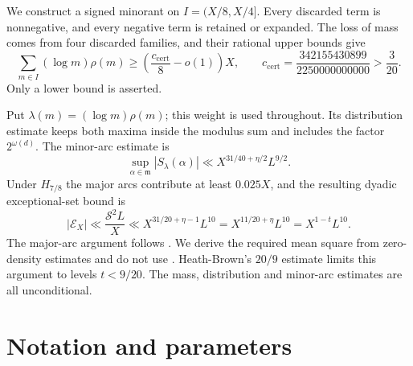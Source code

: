 \documentclass{amsart}
\newcounter{fact}
\numberwithin{equation}{section}
\numberwithin{table}{section}
\newcommand{\ccert}{c_{\mathrm{cert}}}
\begin{document}
We construct a signed minorant on $I=(X/8,X/4]$.
Every discarded term is nonnegative, and every negative term is retained
or expanded. The loss of mass comes from four discarded families, and
their rational upper bounds give
\begin{equation}\label{eq:intro-mass}
\sum_{m\in I}(\log m)\rho(m)
\ge\left(\frac{\ccert}{8}-o(1)\right)X,
\qquad
\ccert=\frac{342155430899}{2250000000000}>\frac3{20}.
\end{equation}
Only a lower bound is asserted.

Put $\lambda(m)=(\log m)\rho(m)$; this weight is used throughout.
Its distribution estimate keeps both maxima inside the modulus sum
and includes the factor $2^{\omega(d)}$.
The minor-arc estimate is
\[
\sup_{\alpha\in\mathfrak m}|S_\lambda(\alpha)|
\ll X^{31/40+\eta/2}L^{9/2}.
\]
Under $H_{7/8}$ the major arcs contribute at least $0.025X$, and the
resulting dyadic exceptional-set bound is
\[
|\mathcal E_X|\ll\frac{\mathcal S^2L}{X}
\ll X^{31/20+\eta-1}L^{10}
=X^{11/20+\eta}L^{10}=X^{1-t}L^{10}.
\]
The major-arc argument follows \cite[Section~8]{Pi}. We derive the
required mean square from zero-density estimates and do not use
\cite[(8.25)]{Pi}. Heath-Brown's $20/9$ estimate limits this argument to
levels $t<9/20$. The mass, distribution and minor-arc estimates are all
unconditional.

\section{Notation and parameters}\label{sec:notation}
\end{document}
